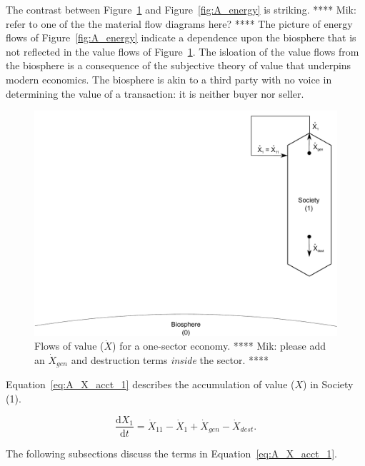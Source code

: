 The contrast between Figure~\ref{fig:A_value} and Figure~\ref{fig:A_energy}
is striking. **** Mik: refer to one of the the material flow diagrams here? ****
The picture of energy flows of Figure~\ref{fig:A_energy} indicate a dependence
upon the biosphere that is not reflected in the
value flows of Figure~\ref{fig:A_value}.
The isloation of the value flows from the biosphere is a consequence
of the subjective theory of value 
that underpins modern economics.
The biosphere is akin to a third party with no voice 
in determining the value of a transaction:
it is neither buyer nor seller. 

\begin{figure}[h!]
\centering
\includegraphics[width=0.8\linewidth]{Part_3/Chapter_Values/images/1_sector_value.pdf}
\caption{Flows of value ($\dot{X}$) for a one-sector economy. 
**** Mik: please add an $\dot{X}_{gen}$ and destruction terms \emph{inside} the sector. ****}
\label{fig:A_value} 
\end{figure}

Equation~\ref{eq:A_X_acct_1} describes the accumulation 
of value
($X$) in Society (1).

\begin{equation} \label{eq:A_X_acct_1}
	\frac{\mathrm{d}X_{1}}{\mathrm{d}t} 
	= \dot{X}_{11} 
	- \dot{X}_{1}
	+ \dot{X}_{gen}
	- \dot{X}_{dest}.
\end{equation}

The following subsections discuss the terms in Equation~\ref{eq:A_X_acct_1}.


